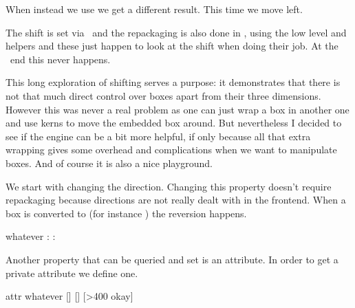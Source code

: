 \startlinecorrection
\getbuffer[demo]\getbuffer
\stoplinecorrection

When instead we use \type {\vpackbox} we get a different result. This time we
move left.

\startbuffer
\hbox\bgroup
    \showstruts \strut
    \quad                            \copy\scratchbox
    \quad \shiftbox\scratchbox -10mm \copy\scratchbox
    \quad \vpackbox\scratchbox       \copy\scratchbox
    \quad \strut
\egroup
\stopbuffer

\typebuffer[option=TEX]

\startlinecorrection
\getbuffer[demo]\getbuffer
\stoplinecorrection

The shift is set via \LUA\ and the repackaging is also done in \LUA, using the
low level  and  helpers and these just happen to look
at the shift when doing their job. At the \TEX\ end this never happens.

This long exploration of shifting serves a purpose: it demonstrates that there is
not that much direct control over boxes apart from their three dimensions.
However this was never a real problem as one can just wrap a box in another one
and use kerns to move the embedded box around. But nevertheless I decided to see
if the engine can be a bit more helpful, if only because all that extra wrapping
gives some overhead and complications when we want to manipulate boxes. And of
course it is also a nice playground.

We start with changing the direction. Changing this property doesn't require
repackaging because directions are not really dealt with in the frontend. When
a box is converted to (for instance \PDF) the reversion happens.

\startbuffer
\setbox\scratchbox\hbox{whatever}
\the\boxdirection\scratchbox: \copy\scratchbox \crlf
\boxdirection{}
\the\boxdirection\scratchbox: \copy\scratchbox
\stopbuffer

\typebuffer[option=TEX]

\startlinecorrection
\getbuffer
\stoplinecorrection

Another property that can be queried and set is an attribute. In order to get
a private attribute we define one.

\startbuffer
\newattribute\MyAt
\setbox\scratchbox\hbox attr  {whatever}
[\the\boxattribute\scratchbox\MyAt]
\boxattribute\scratchbox{}
[\the\boxattribute\scratchbox\MyAt]
[\ifnum\boxattribute\scratchbox\MyAt>400 okay\fi]
\stopbuffer

